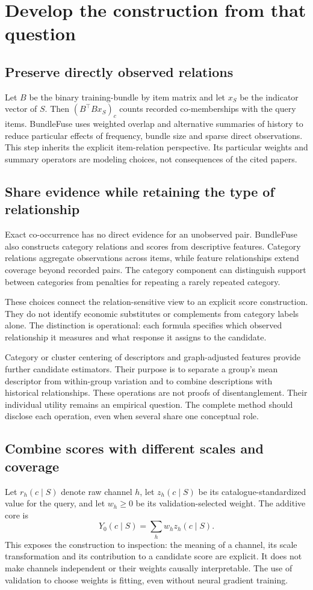 \documentclass[11pt,a4paper]{article}
\begin{document}
\section{Develop the construction from that question}
\subsection{Preserve directly observed relations}
Let $B$ be the binary training-bundle by item matrix and let $x_S$ be the indicator
vector of $S$. Then $(B^\top Bx_S)_c$ counts recorded co-memberships with the query
items. BundleFuse uses weighted overlap and alternative summaries of history to
reduce particular effects of frequency, bundle size and sparse direct observations.
This step inherits the explicit item-relation perspective. Its particular weights
and summary operators are modeling choices, not consequences of the cited papers.

\subsection{Share evidence while retaining the type of relationship}
Exact co-occurrence has no direct evidence for an unobserved pair. BundleFuse also
constructs category relations and scores from descriptive features. Category
relations aggregate observations across items, while feature relationships extend
coverage beyond recorded pairs. The category component can distinguish support
between categories from penalties for repeating a rarely repeated category.

These choices connect the relation-sensitive view to an explicit score construction.
They do not identify economic substitutes or complements from category labels alone.
The distinction is operational: each formula specifies which observed relationship
it measures and what response it assigns to the candidate.

Category or cluster centering of descriptors and graph-adjusted features provide
further candidate estimators. Their purpose is to separate a group's mean descriptor
from within-group variation and to combine descriptions with historical relationships.
These operations are not proofs of disentanglement. Their individual utility remains
an empirical question. The complete method should disclose each operation, even when
several share one conceptual role.

\subsection{Combine scores with different scales and coverage}
Let $r_h(c\mid S)$ denote raw channel $h$, let $z_h(c\mid S)$ be its catalogue-standardized
value for the query, and let $w_h\geq0$ be its validation-selected weight. The additive
core is
\[
 Y_0(c\mid S)=\sum_h w_h z_h(c\mid S).
\]
This exposes the construction to inspection: the meaning of a channel, its scale
transformation and its contribution to a candidate score are explicit. It does not
make channels independent or their weights causally interpretable. The use of
validation to choose weights is fitting, even without neural gradient training.
\end{document}
